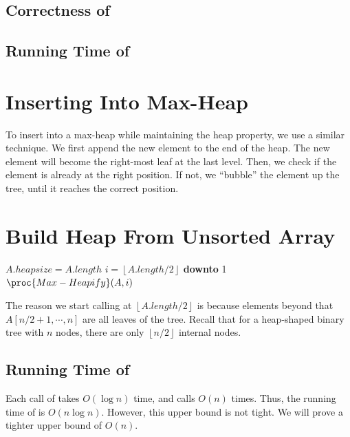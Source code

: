 \subsection{Correctness of }

\subsection{Running Time of }

\section{Inserting Into Max-Heap}

To insert into a max-heap while maintaining the heap property, we use a similar technique. We first append the new element to the end of the heap. The new element will become the right-most leaf at the last level. Then, we check if the element is already at the right position. If not, we ``bubble'' the element up the tree, until it reaches the correct position.

\section{Build Heap From Unsorted Array}

\begin{codebox}
    \li $A.heapsize = A.length$
    \li \For $i = \left\lfloor A.length / 2 \right\rfloor$ \textbf{downto} 1
    \li \Then $\proc{Max-Heapify}(A,i)$
    \End
\end{codebox}


The reason we start calling  at $\left\lfloor A.length / 2 \right\rfloor$ is because elements beyond that $A[n / 2+1, \cdots, n]$ are all leaves of the tree. Recall that for a heap-shaped binary tree with $n$ nodes, there are only $\left\lfloor n / 2 \right\rfloor$ internal nodes.

\subsection{Running Time of }

Each call of  takes $O(\log n)$ time, and  calls  $O(n)$ times. Thus, the running time of  is $O(n \log n)$. However, this upper bound is not tight. We will prove a tighter upper bound of $O(n)$.

